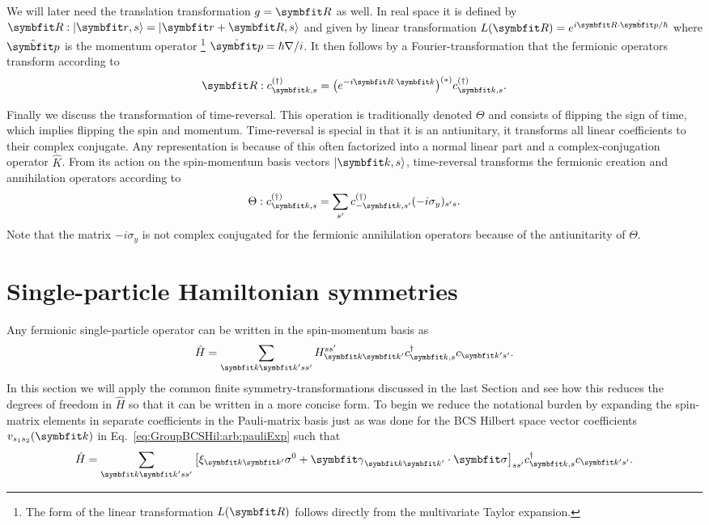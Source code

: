 We will later need the translation transformation $g=\v{R}$ as well. In real space it is defined by $\v{R}:\ket{\v{r},s} = \ket{\v{r}+\v{R},s}$
and given by linear transformation $L(\v{R}) = e^{i\v{R}\cdot\hat{\v{p}}/\hbar}$ where $\hat{\v{p}}$ is the momentum operator%
\footnote{The form of the linear transformation $L(\v{R})$ follows directly from the multivariate Taylor expansion.} $\hat{\v{p}} = \hbar\nabla/i$.
It then follows by a Fourier-transformation that the fermionic operators transform according to
\begin{equation}
    \label{eq:Group:App:Ladder:translation}
    \v{R}:c^{(\dagger)}_{\v{k},s} = \big(e^{-i\v{R}\cdot\v{k}}\big)^{(\ast)}c^{(\dagger)}_{\v{k},s}.
\end{equation}

Finally we discuss the transformation of time-reversal. This operation is traditionally denoted $\Theta$ and consists of flipping the sign of
time, which implies flipping the spin and momentum. Time-reversal is special in that it is an antiunitary, \ie it transforms all linear coefficients
to their complex conjugate. Any representation is
because of this often factorized into a normal linear part and a complex-conjugation operator $\hat{K}$. From its action on the
spin-momentum basis vectors $\ket{\v{k},s}$, time-reversal transforms the fermionic creation and annihilation operators according to
\begin{equation}
    \label{eq:Group:App:Ladder:timeReversal}
    \Theta:c^{(\dagger)}_{\v{k},s} = \sum_{s'}c^{(\dagger)}_{-\v{k},s'}(-i\sigma_y)_{s's}.
\end{equation}
Note that the matrix $-i\sigma_y$ is not complex conjugated for the fermionic annihilation operators because of the antiunitarity of $\Theta$.


\section{Single-particle Hamiltonian symmetries}

Any fermionic single-particle operator can be written in the spin-momentum basis as
\begin{equation}
    \label{eq:Group:Single:generalHamiltonian}
    \hat{H} = \sum_{\v{k}\v{k}'ss'}H^{ss'}_{\v{k}\v{k}'}c^{\dagger}_{\v{k},s}c_{\v{k}'s'}.
\end{equation}
In this section we will apply the common finite symmetry-transformations discussed in the last Section and see how this reduces the degrees
of freedom in $\hat{H}$ so that it can be written in a more concise form. To begin we reduce the notational burden by expanding the spin-matrix
elements in separate coefficients in the Pauli-matrix basis just as was done for the BCS Hilbert space vector coefficients $v_{s_1s_2}(\v{k})$ in
Eq.~\eqref{eq:GroupBCSHil:arb:pauliExp} such that
\begin{equation}
    \label{eq:Group:Single:pauliMatrices}
    \hat{H} = \sum_{\v{k}\v{k}'ss'}\big[\xi_{\v{k}\v{k}'}\sigma^0 + \v{\gamma}_{\v{k}\v{k}'}\cdot\v{\sigma}\big]_{ss'}c^{\dagger}_{\v{k},s}c_{\v{k}'s'}.
\end{equation}

